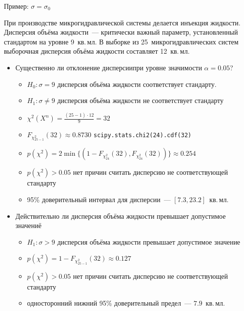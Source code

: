 \documentclass[11pt,pdf,utf8,hyperref={unicode},aspectratio=169]{beamer}
\begin{document}
\begin{frame}[allowframebreaks]{Пример:  $\sigma=\sigma_0$ }
        \begin{block}{}
            При производстве микрогидравлической системы делается инъекция жидкости.
            Дисперсия объёма жидкости~--- критически важный параметр, установленный стандартом на уровне 9~кв.\,мл.
            В выборке из 25~микрогидравлических систем выборочная дисперсия объёма жидкости составляет 12~кв.\,мл.
        \end{block}
        \begin{itemize}
            \item {} Существенно ли отклонение дисперсиипри уровне значимости $\alpha=0.05$?
            \begin{itemize}
                \item $H_0\colon \sigma = 9$ дисперсия объёма жидкости соответствует стандарту.
                \item  $H_1\colon \sigma \neq 9$ дисперсия объёма жидкости не соответствует стандарту
                \item $\chi^2(X^n)= \frac{(25-1)\cdot 12}{9} = 32$
                \item $F_{\chi^2_{25-1}}(32) \approx 0.8730$\hfill
                \alert{\texttt{scipy.stats.chi2(24).cdf(32)}}
                \item $p(\chi^2) = 2\min\{(1-F_{\chi^2_{24}}(32), F_{\chi^2_{24}}(32))\} \approx 0.254$
                \item $p(\chi^2) > 0.05$ нет причин считать дисперсию не соответствующей стандарту
                \item 95\% доверительный интервал для дисперсии~--- $\left[7.3, 23.2\right]$~кв.\,мл.
           \end{itemize}
           \framebreak
            \item {} Действительно ли дисперсия объёма жидкости превышает допустимое значениё
            \begin{itemize}
                \item  $H_1\colon \sigma > 9$ дисперсия объёма жидкости превышает допустимое значение
                \item $p(\chi^2) = 1-F_{\chi^2_{25-1}}(32) \approx  0.127 $
                \item $p(\chi^2) > 0.05$ нет причин считать дисперсию не соответствующей стандарту
                \item  односторонний нижний 95\% доверительный предел~--- $7.9$~кв.\,мл.
           \end{itemize}
       \end{itemize}
\end{frame}
\end{document}
